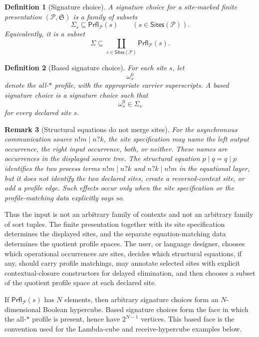 \documentclass[11pt]{article}
\newcommand{\Sites}{\mathsf{Sites}}
\newcommand{\Prfl}{\mathsf{Prfl}}
\newcommand{\Sig}{\Sigma}
\newtheorem{definition}{Definition}[section]
\newtheorem{remark}[definition]{Remark}
\begin{document}
\begin{definition}[Signature choice]
A signature choice for a site-marked finite presentation
\((\mathcal{P},\mathfrak{S})\) is a family of subsets
\[
  \Sig_s\subseteq\Prfl_{\mathcal{P}}(s)
  \qquad
  (s\in\Sites(\mathcal{P})).
\]
Equivalently, it is a subset
\[
  \Sig
  \subseteq
  \coprod_{s\in\Sites(\mathcal{P})}\Prfl_{\mathcal{P}}(s).
\]
\end{definition}

\begin{definition}[Based signature choice]
For each site \(s\), let
\[
  \omega^0_s
\]
denote the all-\(\ast\) profile, with the appropriate carrier superscripts.
A based signature choice is a signature choice such that
\[
  \omega^0_s\in\Sig_s
\]
for every declared site \(s\).
\end{definition}

\begin{remark}[Structural equations do not merge sites]
For the asynchronous communication source \(n!m\mid n?k\), the site
specification may name the left output occurrence, the right input occurrence,
both, or neither.  These names are occurrences in the displayed source tree.
The structural equation \(p\mid q=q\mid p\) identifies the two process terms
\(n!m\mid n?k\) and \(n?k\mid n!m\) in the equational layer, but it does
not identify the two declared sites, create a reversed-context site, or add a
profile edge.  Such effects occur only when the site specification or the
profile-matching data explicitly says so.
\end{remark}

Thus the input is not an arbitrary family of contexts and not an arbitrary family of sort tuples. The finite presentation together with its site specification determines the displayed sites, and the separate equation-matching data determines the quotient profile spaces. The user, or language designer, chooses which operational occurrences are sites, decides which structural equations, if any, should carry profile matchings, may annotate selected sites with explicit contextual-closure constructors for delayed elimination, and then chooses a subset of the quotient profile space at each declared site.

If \(\Prfl_{\mathcal{P}}(s)\) has \(N\) elements, then arbitrary signature choices form an \(N\)-dimensional Boolean hypercube.  Based signature choices form the face in which the all-\(\ast\) profile is present, hence have \(2^{N-1}\) vertices.  This based face is the convention used for the Lambda-cube and receive-hypercube examples below.
\end{document}
